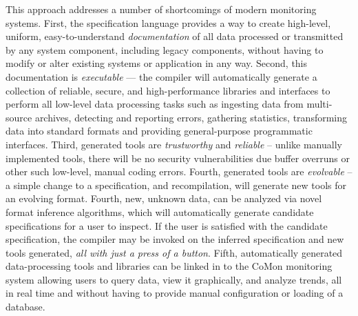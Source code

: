 

This approach addresses a number of shortcomings of modern monitoring
systems.  First, the \pads{} specification language provides a 
way to create high-level, uniform, easy-to-understand {\em documentation}
of all data processed or transmitted by any system component, 
including legacy components, without having to modify or alter existing
systems or
application in any way.  Second, this documentation is 
{\em executable} --- the
\pads{} compiler will automatically generate a collection of
reliable, secure, and high-performance libraries and interfaces
to perform all low-level data processing tasks such as ingesting
data from multi-source archives, detecting and reporting
errors, gathering statistics, 
transforming data into standard formats and providing
general-purpose programmatic interfaces.  Third, generated
tools are {\em trustworthy} and {\em reliable} -- unlike manually 
implemented tools, there will be no security vulnerabilities due
buffer overruns or other such low-level, manual coding errors.
Fourth, generated tools are {\em evolvable} -- a simple change to
a specification, and recompilation, will generate new tools for
an evolving format.  Fourth, new, unknown data, can be analyzed
via novel format inference algorithms, which will automatically generate
candidate specifications for a user to inspect.  If the user
is satisfied with the candidate specification, the \pads{} compiler
may be invoked on the inferred specification and new tools generated,
{\em all with just a press of a button}.
Fifth, automatically generated data-processing tools and libraries 
can be linked in to the CoMon monitoring
system allowing users to query
data, view it graphically, and analyze trends, all in real
time and without having
to provide manual configuration or loading of a database.

